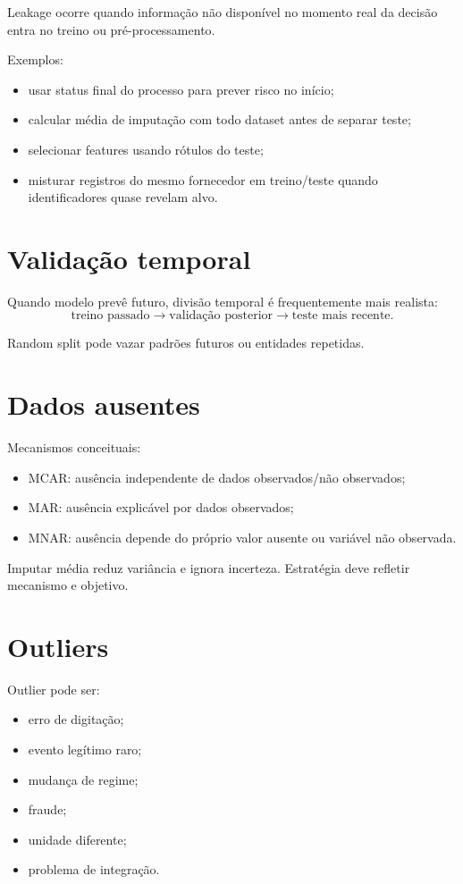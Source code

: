 Leakage ocorre quando informação não disponível no momento real da decisão entra no treino ou pré-processamento.

Exemplos:
\begin{itemize}
\item usar status final do processo para prever risco no início;
\item calcular média de imputação com todo dataset antes de separar teste;
\item selecionar features usando rótulos do teste;
\item misturar registros do mesmo fornecedor em treino/teste quando identificadores quase revelam alvo.
\end{itemize}

\section{Validação temporal}

Quando modelo prevê futuro, divisão temporal é frequentemente mais realista:
\[
\text{treino passado}\rightarrow\text{validação posterior}\rightarrow\text{teste mais recente}.
\]

Random split pode vazar padrões futuros ou entidades repetidas.

\section{Dados ausentes}

Mecanismos conceituais:
\begin{itemize}
\item MCAR: ausência independente de dados observados/não observados;
\item MAR: ausência explicável por dados observados;
\item MNAR: ausência depende do próprio valor ausente ou variável não observada.
\end{itemize}

Imputar média reduz variância e ignora incerteza. Estratégia deve refletir mecanismo e objetivo.

\section{Outliers}

Outlier pode ser:
\begin{itemize}
\item erro de digitação;
\item evento legítimo raro;
\item mudança de regime;
\item fraude;
\item unidade diferente;
\item problema de integração.
\end{itemize}

